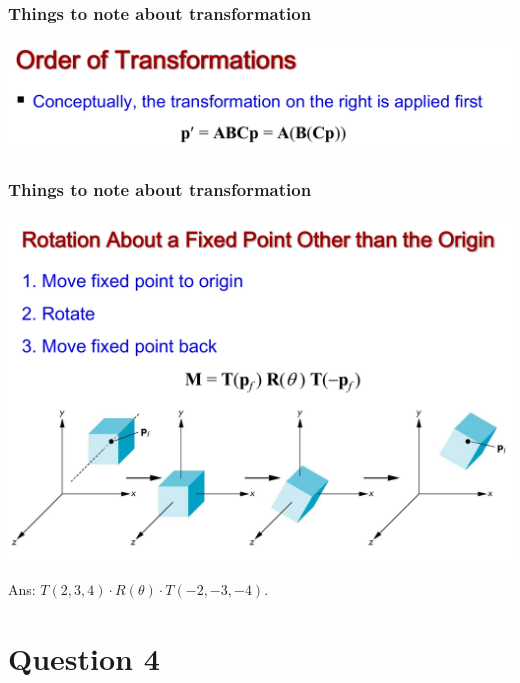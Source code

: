 \documentclass{beamer}
\begin{document}
\begin{frame}
    \frametitle{Things to note about transformation}


    \begin{center}
        \includegraphics[scale=0.4]{order-of-trans.png}
    \end{center}

\end{frame}

\begin{frame}
    \frametitle{Things to note about transformation}


    \begin{center}
        \includegraphics[scale=0.3]{rotate-about-fixed-pt.png}
    \end{center}

    \begin{tcolorbox}
        Ans: $T(2,3,4) \cdot R(\theta) \cdot T(-2, -3, -4)$.
    \end{tcolorbox}

\end{frame}

\section{Question 4}
\end{document}
